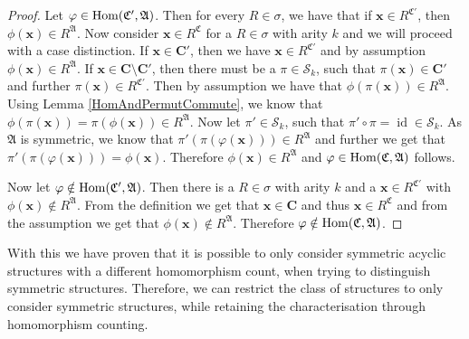 \begin{proof}
	Let $\varphi\in \operatorname{Hom}(\mathfrak C',\mathfrak A)$.
	Then for every $R\in \sigma$, we have that if $\mathbf x\in R^{\mathfrak C'}$, then $\phi(\mathbf x)\in R^{\mathfrak A}$.
	Now consider $\mathbf x\in R^{\mathfrak C}$ for a $R\in \sigma$ with arity $k$ and we will proceed with a case distinction.
	If $\mathbf x\in \mathbf{C'}$, then we have $\mathbf x\in R^{\mathfrak C'}$ and by assumption $\phi(\mathbf x)\in R^{\mathfrak A}$.
	If $\mathbf x\in \mathbf C\setminus\mathbf{C'}$, then there must be a $\pi\in \mathcal S_k$, such that $\pi(\mathbf x)\in \mathbf{C'}$ and further $\pi(\mathbf x)\in R^{\mathfrak C'}$.
	Then by assumption we have that $\phi(\pi(\mathbf x))\in R^{\mathfrak A}$.
	Using Lemma \ref{HomAndPermutCommute}, we know that $\phi(\pi(\mathbf x))=\pi(\phi(\mathbf x))\in R^{\mathfrak A}$.
	Now let $\pi'\in \mathcal S_k$, such that $\pi'\circ\pi=\operatorname{id}\in \mathcal S_k$.
	As $\mathfrak A$ is symmetric, we know that $\pi'(\pi(\varphi(\mathbf x)))\in R^{\mathfrak A}$ and further we get that $\pi'(\pi(\varphi(\mathbf x)))=\phi(\mathbf x)$.
	Therefore $\phi(\mathbf x)\in R^{\mathfrak A}$ and $\varphi\in\operatorname{Hom}(\mathfrak C,\mathfrak A)$ follows.
	
	Now let $\varphi\notin\operatorname{Hom}(\mathfrak C',\mathfrak A)$.
	Then there is a $R\in\sigma$ with arity $k$ and a $\mathbf x\in R^{\mathfrak C'}$ with $\phi(\mathbf x)\notin R^{\mathfrak A}$.
	From the definition we get that $\mathbf x\in \mathbf{C}$ and thus $\mathbf x \in R^{\mathfrak C}$ and from the assumption we get that $\phi(\mathbf x)\notin R^{\mathfrak A}$.
	Therefore $\varphi\notin \operatorname{Hom}(\mathfrak C,\mathfrak A)$.
\end{proof}

With this we have proven that it is possible to only consider symmetric acyclic structures with a different homomorphism count, when trying to distinguish symmetric structures.
Therefore, we can restrict the class of structures to only consider symmetric structures, while retaining the characterisation through homomorphism counting.



